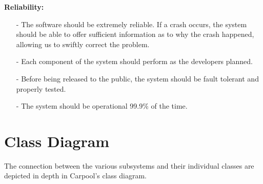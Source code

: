 \documentclass[hidelinks, 12pt, a4paper]{article}
\begin{document}
 \vspace{0.5cm}            
        \large{ \textbf{Reliability:}}
            \begin{itemize}
             \item[-] The software should be extremely reliable. If a crash occurs, the system should be able to offer sufficient information as to why the crash happened, allowing us to swiftly correct the problem.
             \item[-] Each component of the system should perform as the developers planned.
             \item[-] Before being released to the public, the system should be fault tolerant and properly tested.
             \item[-] 	The system should be operational 99.9\% of the time.

             \end{itemize}


\newpage
\section{Class Diagram}
The connection between the various subsystems and their individual classes are depicted in depth in Carpool’s class diagram.
\vspace{1.5cm}
    
\end{document}
